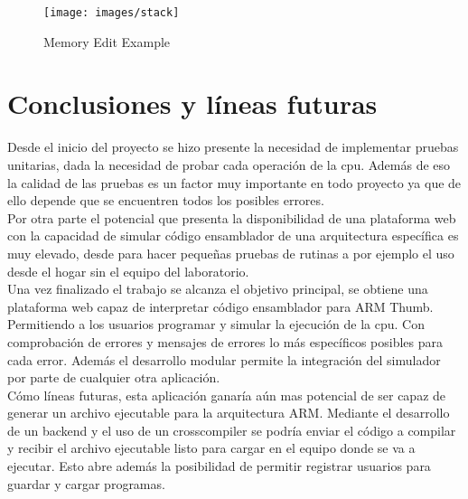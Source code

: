{{            %


            \begin{figure}[h]
                \centering
                \texttt{[image: images/stack]}
                \caption{Memory Edit Example}
            \end{figure}
        }
    }

\section{Conclusiones y líneas futuras}
{
    Desde el inicio del proyecto se hizo presente la necesidad de implementar pruebas unitarias,
    dada la necesidad de probar cada operación de la cpu. Además de eso la calidad de las pruebas es un factor
    muy importante en todo proyecto ya que de ello depende que se encuentren todos los posibles errores. \\

    Por otra parte el potencial que presenta la disponibilidad de una plataforma web con la capacidad
    de simular código ensamblador de una arquitectura específica es muy elevado, desde para hacer
    pequeñas pruebas de rutinas a por ejemplo el uso desde el hogar sin el equipo del laboratorio. \\

    Una vez finalizado el trabajo se alcanza el objetivo principal, se obtiene una plataforma web
    capaz de interpretar código ensamblador para ARM Thumb. Permitiendo a los usuarios
    programar y simular la ejecución de la cpu. Con comprobación de errores y mensajes de errores lo más
    específicos posibles para cada error. Además el desarrollo modular permite la integración del simulador
    por parte de cualquier otra aplicación. \\

    Cómo líneas futuras, esta aplicación ganaría aún mas potencial de ser capaz de generar un archivo
    ejecutable para la arquitectura ARM. Mediante el desarrollo de un backend y el uso de un crosscompiler
    se podría enviar el código a compilar y recibir el archivo ejecutable listo para cargar en el equipo donde se
    va a ejecutar. Esto abre además la posibilidad de permitir registrar usuarios para guardar y cargar programas.    
}

